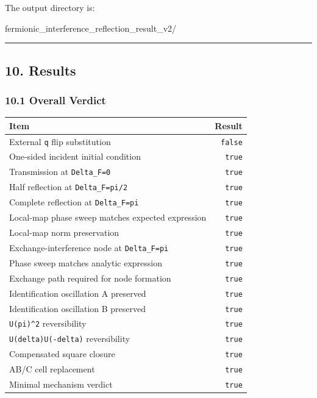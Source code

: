 \documentclass[
  a4paper,
]{article}
\newenvironment{Shaded}{}{}
\newcommand{\NormalTok}[1]{#1}
\newcounter{none} %
\begin{document}
The output directory is:

\begin{Shaded}
\begin{Highlighting}[]
\NormalTok{fermionic\_interference\_reflection\_result\_v2/}
\end{Highlighting}
\end{Shaded}

\begin{center}\rule{0.5\linewidth}{0.5pt}\end{center}

\subsection{10. Results}\label{results}

\subsubsection{10.1 Overall Verdict}\label{overall-verdict}

{\def\LTcaptype{none} %
\begin{longtable}[]{@{}lr@{}}
\toprule\noalign{}
Item & Result \\
\midrule\noalign{}
\endhead
\bottomrule\noalign{}
\endlastfoot
External \texttt{q} flip substitution & \texttt{false} \\
One-sided incident initial condition & \texttt{true} \\
Transmission at \texttt{Delta\_F=0} & \texttt{true} \\
Half reflection at \texttt{Delta\_F=pi/2} & \texttt{true} \\
Complete reflection at \texttt{Delta\_F=pi} & \texttt{true} \\
Local-map phase sweep matches expected expression & \texttt{true} \\
Local-map norm preservation & \texttt{true} \\
Exchange-interference node at \texttt{Delta\_F=pi} & \texttt{true} \\
Phase sweep matches analytic expression & \texttt{true} \\
Exchange path required for node formation & \texttt{true} \\
Identification oscillation A preserved & \texttt{true} \\
Identification oscillation B preserved & \texttt{true} \\
\texttt{U(pi)\^{}2} reversibility & \texttt{true} \\
\texttt{U(delta)U(-delta)} reversibility & \texttt{true} \\
Compensated square closure & \texttt{true} \\
AB/C cell replacement & \texttt{true} \\
Minimal mechanism verdict & \texttt{true} \\
\end{longtable}
}
\end{document}
